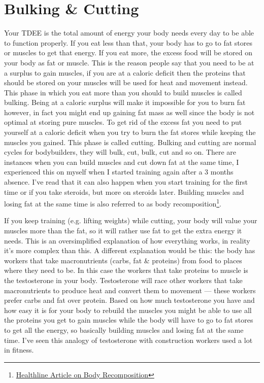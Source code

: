 \documentclass[openany, 12pt]{book}
\begin{document}
	\section{Bulking \& Cutting}	
	
	Your TDEE is the total amount of energy your body needs every day to be able to function properly. If you eat less than that, your body has to go to fat stores or muscles to get that energy. If you eat more, the excess food will be stored on your body as fat or muscle. This is the reason people say that you need to be at a surplus to gain muscles, if you are at a caloric deficit then the proteins that should be stored on your muscles will be used for heat and movement instead. This phase in which you eat more than you should to build muscles is called bulking. Being at a caloric surplus will make it impossible for you to burn fat however, in fact you might end up gaining fat mass as well since the body is not optimal at storing pure muscles. To get rid of the excess fat you need to put yourself at a caloric deficit when you try to burn the fat stores while keeping the muscles you gained. This phase is called cutting. Bulking and cutting are normal cycles for bodybuilders, they will bulk, cut, bulk, cut and so on. There are instances when you can build muscles and cut down fat at the same time, I experienced this on myself when I started training again after a 3 months absence. I've read that it can also happen when you start training for the first time or if you take steroids, but more on steroids later. Building muscles and losing fat at the same time is also referred to as body recomposition\footnote{\href{https://www.healthline.com/nutrition/body-recomposition\#how-it-works}{Healthline Article on Body Recomposition}}.
	
	If you keep training (e.g. lifting weights) while cutting, your body will value your muscles more than the fat, so it will rather use fat to get the extra energy it needs. This is an oversimplified explanation of how everything works, in reality it's more complex than this. A different explanation would be this: the body has workers that take macronutrients (carbs, fat \& proteins) from food to places where they need to be. In this case the workers that take proteins to muscle is the testosterone in your body. Testosterone will race other workers that take macronutrients to produce heat and convert them to movement --- these workers prefer carbs and fat over protein. Based on how much testosterone you have and how easy it is for your body to rebuild the muscles you might be able to use all the proteins you get to gain muscles while the body will have to go to fat stores to get all the energy, so basically building muscles and losing fat at the same time. I've seen this analogy of testosterone with construction workers used a lot in fitness. 
	
\end{document}
